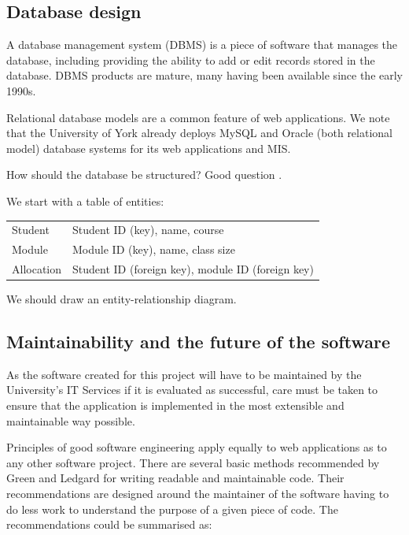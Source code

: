 \documentclass[]{scrartcl}
\begin{document}
\subsection{Database design}

A database management system (DBMS) is a piece of software that manages the database, including providing the ability to add or edit records stored in the database. DBMS products are mature, many having been available since the early 1990s.

Relational database models are a common feature of web applications. We note that the University of York already deploys MySQL and Oracle (both relational model) database systems for its web applications and MIS.

How should the database be structured? Good question \cite{DatabaseModelsLanguagesDesign}.

We start with a table of entities:

\begin{tabular}{ l l }
  Student    & Student ID (key), name, course \\
  Module     & Module ID (key), name, class size \\
  Allocation & Student ID (foreign key), module ID (foreign key) \\
\end{tabular}

We should draw an entity-relationship diagram.

\subsection{Maintainability and the future of the software}

As the software created for this project will have to be maintained by the
University's IT Services if it is evaluated as successful, care must be taken
to ensure that the application is implemented in the most extensible and
maintainable way possible.

Principles of good software engineering apply equally to web applications as
to any other software project. There are several basic methods recommended by
Green and Ledgard \cite{Green:2011:CGF:2063166.2063168} for writing readable
and maintainable code. Their recommendations are designed around the
maintainer of the software having to do less work to understand the purpose of
a given piece of code. The recommendations could be summarised as:
\end{document}
